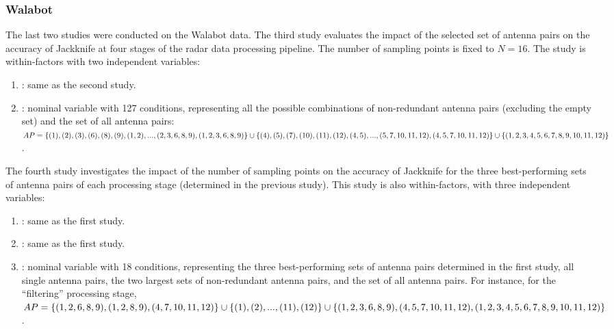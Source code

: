 \subsubsection{Walabot} \label{sec:radar-experiments:sensors:protocol:walabot}
The last two studies were conducted on the Walabot data.
%
The third study evaluates the impact of the selected set of antenna pairs on the accuracy of Jackknife at four stages of the radar data processing pipeline. The number of sampling points is fixed to $N{=}16$. The study is within-factors with two independent variables:
\begin{enumerate}
    \item {}: same as the second study.
    \item {}: nominal variable with 127 conditions, representing all the possible combinations of non-redundant antenna pairs (excluding the empty set) and the set of all antenna pairs: $\splitatcommas{AP=\{(1), (2), (3), (6), (8), (9), (1, 2), ... , (2, 3, 6, 8, 9), (1, 2, 3, 6, 8, 9)\} \cup \{(4), (5), (7), (10), (11), (12), (4, 5), ... , (5, 7, 10, 11, 12), (4, 5, 7, 10, 11, 12)\} \cup \{(1, 2, 3, 4, 5, 6, 7, 8, 9, 10, 11, 12)\}}$.
\end{enumerate}
%
The fourth study investigates the impact of the number of sampling points on the accuracy of Jackknife for the three best-performing sets of antenna pairs of each processing stage (determined in the previous study).
This study is also within-factors, with three independent variables:
\begin{enumerate}
    \item {}: same as the first study.
    \item {}: same as the first study.
    \item {}: nominal variable with 18 conditions, representing the three best-performing sets of antenna pairs determined in the first study, all single antenna pairs, the two largest sets of non-redundant antenna pairs, and the set of all antenna pairs. For instance, for the ``filtering'' processing stage, $\splitatcommas{AP=\{(1, 2, 6, 8, 9), (1, 2, 8, 9), (4, 7, 10, 11, 12)\} \cup \{(1), (2), ..., (11), (12)\} \cup \{(1, 2, 3, 6, 8, 9), (4, 5, 7, 10, 11, 12), (1, 2, 3, 4, 5, 6, 7, 8, 9, 10, 11, 12)\}}$.    
\end{enumerate}
